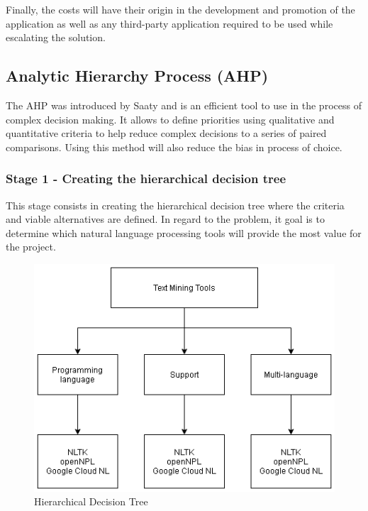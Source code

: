 Finally, the costs will have their origin in the development and promotion of the application as well as any third-party application required to be used while escalating the solution.

\subsection{Analytic Hierarchy Process (AHP)}

The \gls{AHP} was introduced by Saaty\cite{saaty1987analytic} and is an efficient tool to use in the process of complex decision making.
It allows to define priorities using qualitative and quantitative criteria to help reduce complex decisions to a series of paired comparisons.
Using this method will also reduce the bias in process of choice.

\subsubsection{Stage 1 - Creating the hierarchical decision tree}

This stage consists in creating the hierarchical decision tree where the criteria and viable alternatives are defined.
In regard to the problem, it goal is to determine which natural language processing tools will provide the most value for the project.

\begin{figure}[H]
\centering
\includegraphics[scale=0.5]{ch3/assets/AHP.png}
\caption[Hierarchical Decision Tree]{Hierarchical Decision Tree}
\label{fig:AHP}
\end{figure}

